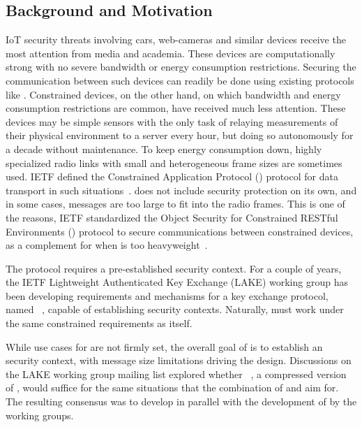 \documentclass[runningheads, envcountsame, a4paper, draft, x11names]{llncs}
\newcommand{\fillhack}{\vspace{-0.5em}}
\begin{document}
\subsection{Background and Motivation}
\label{sec:motivation}
\fillhack
IoT security threats involving cars, web-cameras and similar devices
receive the most attention from media and academia.
%
These devices are computationally strong with no severe bandwidth or energy
consumption restrictions.
%
Securing the communication between such devices can readily be done using
existing protocols like \mDandTls.
%
Constrained devices, on the other hand, on which bandwidth and
energy consumption restrictions are common, have received much less attention.
%
These devices may be simple sensors with the only task of relaying
measurements of their physical environment to a server every hour, but doing so
autonomously for a decade without maintenance.
%
To keep energy consumption down, highly specialized radio links with small
and heterogeneous frame sizes are sometimes used.
%
IETF defined the Constrained Application Protocol (\mCoap{}) protocol for data
transport in such situations~\cite{rfc7252}.
%
\mCoap{} does not include security protection on its own, and in some cases,
\mDandTls{} messages are too large to fit into the radio frames.
%
This is one of the reasons, IETF standardized the Object Security for
Constrained RESTful Environments (\mOscore{}) protocol to secure
communications between constrained devices, as a complement for when
\mDandTls{} is too heavyweight~\cite{rfc8613}.
%

The \mOscore{} protocol requires a pre-established security context.
%
For a couple of years, the IETF Lightweight Authenticated Key Exchange (LAKE)
working group has been developing requirements and mechanisms for a key
exchange protocol, named \mEdhoc~\cite{selander-lake-edhoc-01}, capable of
establishing \mOscore{} security contexts.
%
Naturally, \mEdhoc{} must work under the same constrained requirements as
\mOscore{} itself.
%

While use cases for \mEdhoc{} are not firmly set, the overall goal of \mEdhoc{}
is to establish an \mOscore{} security context, with message size limitations
driving the design.
%
Discussions on the LAKE working group mailing list explored whether
\mCtls~\cite{ietf-tls-ctls-00}, a compressed version of \mTls, would suffice
for the same situations that the combination of \mOscore{} and \mEdhoc{} aim
for.
%
The resulting consensus was to develop \mEdhoc{} in parallel with the
development of \mCtls{} by the \mTls{} working groups.
%
\end{document}
